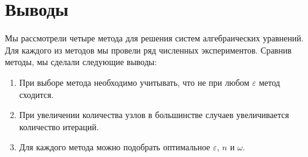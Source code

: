 \chapter{Выводы}

Мы рассмотрели четыре метода для решения систем алгебраических уравнений. Для каждого из методов мы провели ряд численных экспериментов. Сравнив методы, мы сделали следующие выводы:

\begin{enumerate}
	\item При выборе метода необходимо учитывать, что не при любом $\varepsilon$ метод сходится.
	\item При увеличении количества узлов в большинстве случаев увеличивается количество итераций.
	\item Для каждого метода можно подобрать оптимальное $\varepsilon$, $n$ и $\omega$.
\end{enumerate}